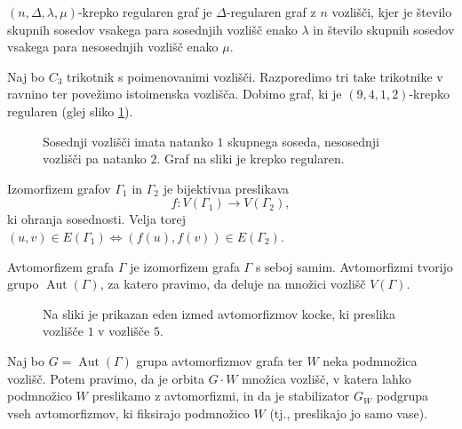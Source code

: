 \documentclass[fin1, tisk]{fmfdelo}
\newcommand{\aut}{\operatorname{Aut}}
\begin{document}
\begin{definicija}\label{def:krepko_regularen_graf}
    $(n, \Delta, \lambda, \mu)$-krepko regularen graf je $\Delta$-regularen graf z $n$ vozlišči, kjer 
    je število skupnih sosedov vsakega para sosednjih vozlišč enako $\lambda$ in število skupnih 
    sosedov vsakega para nesosednjih vozlišč enako $\mu$.
\end{definicija}

\begin{zgled}
Naj bo $C_3$ trikotnik s poimenovanimi vozlišči. Razporedimo tri take trikotnike v ravnino ter povežimo 
istoimenska vozlišča. Dobimo graf, ki je $(9, 4, 1, 2)$-krepko regularen (glej sliko \ref{fig:k3circk3}).
\end{zgled}

\begin{figure}[ht]
    \centering
    \def\svgwidth{\columnwidth}
    \caption{Sosednji vozlišči imata natanko $1$ skupnega soseda, nesosednji vozlišči pa natanko $2$.
        Graf na sliki je krepko regularen.}
    \label{fig:k3circk3}
\end{figure}


\begin{definicija}
    Izomorfizem grafov $\Gamma_1$ in $\Gamma_2$ je bijektivna preslikava $$f: V(\Gamma_1) \to V(\Gamma_2),$$ ki ohranja sosednosti.
    Velja torej $(u, v) \in E(\Gamma_1) \iff (f(u), f(v)) \in E(\Gamma_2)$.
\end{definicija}
\begin{definicija}
    Avtomorfizem grafa $\Gamma$ je izomorfizem grafa $\Gamma$ s seboj samim.
    Avtomorfizmi tvorijo grupo $\aut(\Gamma)$, za katero pravimo, da deluje na množici vozlišč $V(\Gamma)$.
\end{definicija}

\begin{figure}[H]
    \centering
    \def\svgwidth{\columnwidth}
    \caption{Na sliki je prikazan eden izmed avtomorfizmov kocke, ki preslika vozlišče $1$ v vozlišče $5$.}
    \label{fig:avtomorfizem-kocke}
\end{figure}

\begin{definicija}\label{def:orbita_stabilizator}
    Naj bo $G = \aut(\Gamma)$ grupa avtomorfizmov grafa ter $W$ neka podmnožica vozlišč.
    Potem pravimo, da je orbita $G\cdot W$ množica vozlišč, v katera lahko podmnožico $W$ preslikamo z avtomorfizmi,
    in da je stabilizator $G_W$ podgrupa vseh avtomorfizmov, ki fiksirajo podmnožico $W$ (tj., preslikajo jo samo vase).
\end{definicija}
\end{document}
